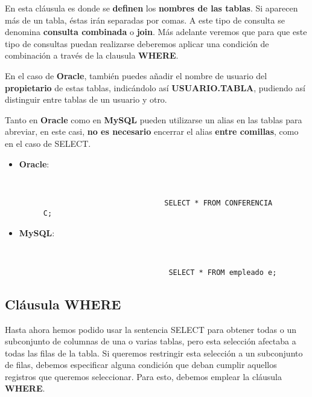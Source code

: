 En esta cláusula es donde se \textbf{definen} los \textbf{nombres de las tablas}. Si aparecen más de un tabla, éstas irán separadas por comas.  A este tipo de consulta se denomina \textbf{consulta combinada} o \textbf{join}. Más adelante veremos que para que este tipo de consultas puedan realizarse deberemos aplicar una condición de combinación a través de la clausula \textbf{WHERE}.

En el caso de \textbf{Oracle}, también puedes añadir el nombre de usuario del \textbf{propietario} de estas tablas, indicándolo así \textbf{USUARIO.TABLA}, pudiendo así distinguir entre tablas de un usuario y otro.

Tanto en \textbf{Oracle} como en \textbf{MySQL} pueden utilizarse un alias en las tablas para abreviar, en este casi, \textbf{no es necesario} encerrar el alias \textbf{entre comillas}, como en el caso de SELECT.

\begin{itemize}
    \item \textbf{Oracle}:

     \begin{figure}[H]
     \begin{tcolorbox}[sharp corners, colback=yellow!30, colframe=white!20]
         \scriptsize
         \begin{verbatim}


                            SELECT * FROM CONFERENCIA C;
         \end{verbatim}
     \end{tcolorbox}
     \end{figure}

     \item \textbf{MySQL}:

     \begin{figure}[H]
     \begin{tcolorbox}[sharp corners, colback=yellow!30, colframe=white!20]
         \scriptsize
         \begin{verbatim}


                             SELECT * FROM empleado e;
         \end{verbatim}
     \end{tcolorbox}
     \end{figure}
\end{itemize}

\subsection{Cláusula WHERE}
Hasta ahora hemos podido usar la sentencia SELECT para obtener todas o un subconjunto de columnas de una o varias tablas, pero esta selección afectaba a todas las filas de la tabla. Si queremos restringir esta selección a un subconjunto de filas, debemos especificar alguna condición que deban cumplir aquellos registros que queremos seleccionar. Para esto, debemos emplear la cláusula \textbf{WHERE}.

